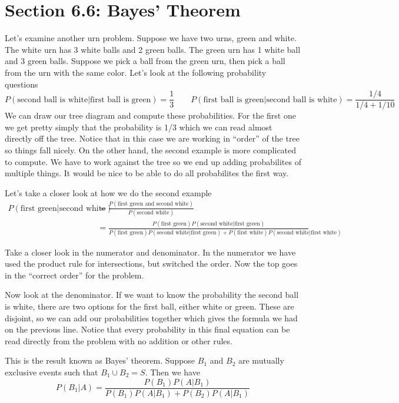\documentclass[14,fleqn]{article}
\begin{document}
\section{Section 6.6: Bayes' Theorem}

Let's examine another urn problem. Suppose we have two urns, green and white. The white urn has 3 white balls and 2 green balls. The green urn has 1 white ball and 3 green balls. Suppose we pick a ball from the green urn, then pick a ball from the urn with the same color. Let's look at the following probability questions
\[
	P(\text{second ball is white}|\text{first ball is green})=\frac{1}{3} \qquad P(\text{first ball is green}|\text{second ball is white})=\frac{1/4}{1/4+1/10}
\]
We can draw our tree diagram and compute these probabilities. For the first one we get pretty simply that the probability is 1/3 which we can read almost directly off the tree. Notice that in this case we are working in ``order'' of the tree so things fall nicely. On the other hand, the second example is more complicated to compute. We have to work against the tree so we end up adding probabilites of multiple things. It would be nice to be able to do all probabilites the first way.

Let's take a closer look at how we do the second example
\begin{align*}
	P(\text{first green}|\text{second white})&=\frac{P(\text{first green and second white})}{P(\text{second white})}\\
						 &=\frac{P(\text{first green})P(\text{second white}|\text{first green})}{P(\text{first green})P(\text{second white}|\text{first green})+P(\text{first white})P(\text{second white}|\text{first white})}
\end{align*}

Take a closer look in the numerator and denominator. In the numerator we have used the product rule for intersections, but switched the order. Now the top goes in the ``correct order'' for the problem.

Now look at the denominator. If we want to know the probability the second ball is white, there are two options for the first ball, either white or green. These are disjoint, so we can add our probabilities together which gives the formula we had on the previous line. Notice that every probability in this final equation can be read directly from the problem with no addition or other rules. 

This is the result known as Bayes' theorem.
Suppose $B_1$ and $B_2$ are mutually exclusive events such that $B_1\cup B_2=S.$ Then we have
\[
	P(B_1|A)=\frac{P(B_1)P(A|B_1)}{P(B_1)P(A|B_1)+P(B_2)P(A|B_1)}
\]
\end{document}
